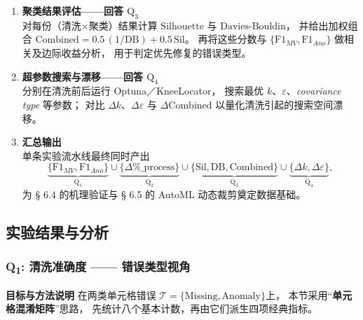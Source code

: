 \documentclass[10pt]{article} %
\numberwithin{equation}{section}
\begin{document}
\begin{enumerate}[label=\textbf{Step\,\arabic*.},itemindent=4em,leftmargin=0pt]
\item \textbf{聚类结果评估——回答 \(\mathrm{Q_3}\)}\\
      对每份（清洗×聚类）结果计算
      \(\mathrm{Silhouette}\) 与 \(\mathrm{Davies\text{-}Bouldin}\)，
      并给出加权组合
      \(\mathrm{Combined}=0.5\,(1/\mathrm{DB}) + 0.5\,\mathrm{Sil}\)。
      再将这些分数与
      \(\{\mathrm{F1}_{MV},\mathrm{F1}_{Ano}\}\) 做相关及边际收益分析，
      用于判定优先修复的错误类型。

\item \textbf{超参数搜索与漂移——回答 \(\mathrm{Q_4}\)}\\
      分别在清洗前后运行 Optuna／KneeLocator，
      搜索最优 \(k\)、\(\varepsilon\)、\textit{covariance type} 等参数；
      对比 \(\Delta k\)、\(\Delta\varepsilon\) 与
      \(\Delta\mathrm{Combined}\) 以量化清洗引起的搜索空间漂移。

\item \textbf{汇总输出}\\
      单条实验流水线最终同时产出  
      \[
        \underbrace{\bigl\{\mathrm{F1}_{MV},\mathrm{F1}_{Ano}\bigr\}}_{\mathrm{Q_1}}
        \cup
        \underbrace{\bigl\{\Delta\%\_{\text{process}}\bigr\}}_{\mathrm{Q_2}}
        \cup
        \underbrace{\bigl\{\mathrm{Sil},\mathrm{DB},\mathrm{Combined}\bigr\}}_{\mathrm{Q_3}}
        \cup
        \underbrace{\bigl\{\Delta k,\Delta\varepsilon\bigr\}}_{\mathrm{Q_4}},
      \]
      为 § 6.4 的机理验证与 § 6.5 的 AutoML 动态裁剪奠定数据基础。

\end{enumerate}

\subsection{实验结果与分析}
\label{sec:exp_results}

\subsubsection{Q\textsubscript{1}: 清洗准确度 —— 错误类型视角}
\label{sec:q1-accuracy}

\textbf{目标与方法说明}\quad
在两类单元格错误 
\(\mathcal{T}=\{\mathrm{Missing},\mathrm{Anomaly}\}\)上，
本节采用“\textbf{单元格混淆矩阵}”思路，
先统计八个基本计数，再由它们派生四项经典指标。
\end{document}
